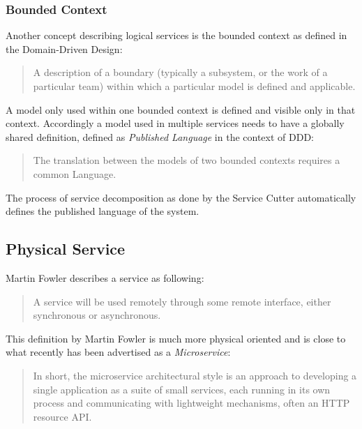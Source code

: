 \subsubsection{Bounded Context}

Another concept describing logical services is the bounded context as defined in the Domain-Driven Design:\cite{evans2014domain}

\begin{quotation}
	A description of a boundary (typically a subsystem, or the work of a particular team) within which a particular model is defined and applicable.
\end{quotation}

A model only used within one bounded context is defined and visible only in that context. Accordingly a model used in multiple services needs to have a globally shared definition, defined as \textit{Published Language} in the context of \gls{DDD}\cite{evans2014domain}:

\begin{quotation}
	The translation between the models of two bounded contexts requires a common Language.
\end{quotation}

The process of service decomposition as done by the Service Cutter automatically defines the published language of the system. 

\subsection{Physical Service}

Martin Fowler describes a service as following:

\begin{quotation}
	A service will be used remotely through some remote interface, either synchronous or asynchronous.\cite{fowlerIoC}
\end{quotation}

This definition by Martin Fowler is much more physical oriented and is close to what recently has been advertised as a \textit{Microservice}:

\begin{quotation}
	In short, the microservice architectural style is an approach to developing a single application as a suite of small services, each running in its own process and communicating with lightweight mechanisms, often an HTTP resource API.\cite{fowlerMicroservice}
\end{quotation}


